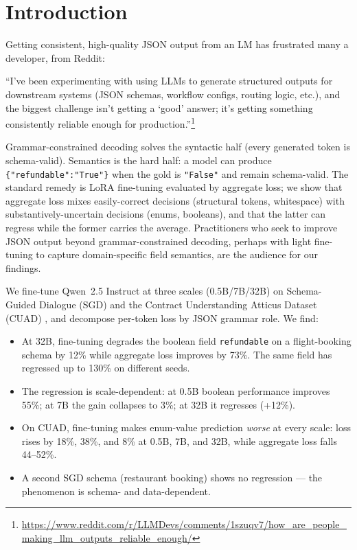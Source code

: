 \documentclass{article}
\begin{document}
\section{Introduction}

Getting consistent, high-quality JSON output from an LM has frustrated many a developer, from Reddit:

``I've been experimenting with using LLMs to generate structured outputs for downstream systems (JSON schemas, workflow configs, routing logic, etc.), and the biggest challenge isn't getting a `good' answer; it's getting something consistently reliable enough for production.''\footnote{\url{https://www.reddit.com/r/LLMDevs/comments/1szuqv7/how_are_people_making_llm_outputs_reliable_enough/}}

Grammar-constrained decoding \cite{guidance2024,willard2023outlines,zheng2024sglang,xgrammar2024} solves the syntactic half (every generated token is schema-valid). Semantics is the hard half: a model can produce \texttt{\{"refundable":"True"\}} when the gold is \texttt{"False"} and remain schema-valid. The standard remedy is LoRA fine-tuning \cite{hu2021lora} evaluated by aggregate loss; we show that aggregate loss mixes easily-correct decisions (structural tokens, whitespace) with substantively-uncertain decisions (enums, booleans), and that the latter can regress while the former carries the average. Practitioners who seek to improve JSON output beyond grammar-constrained decoding, perhaps with light fine-tuning to capture domain-specific field semantics, are the audience for our findings.

We fine-tune Qwen~2.5 Instruct at three scales (0.5B/7B/32B) on Schema-Guided Dialogue (SGD) \cite{rastogi2020sgd} and the Contract Understanding Atticus Dataset (CUAD) \cite{hendrycks2021cuad}, and decompose per-token loss by JSON grammar role. We find:

\begin{itemize}
\item At 32B, fine-tuning degrades the boolean field \texttt{refundable} on a flight-booking schema by 12\% while aggregate loss improves by 73\%. The same field has regressed up to 130\% on different seeds.
\item The regression is scale-dependent: at 0.5B boolean performance improves 55\%; at 7B the gain collapses to 3\%; at 32B it regresses (+12\%).
\item On CUAD, fine-tuning makes enum-value prediction \emph{worse} at every scale: loss rises by 18\%, 38\%, and 8\% at 0.5B, 7B, and 32B, while aggregate loss falls 44--52\%.
\item A second SGD schema (restaurant booking) shows no regression --- the phenomenon is schema- and data-dependent.
\end{itemize}
\end{document}

